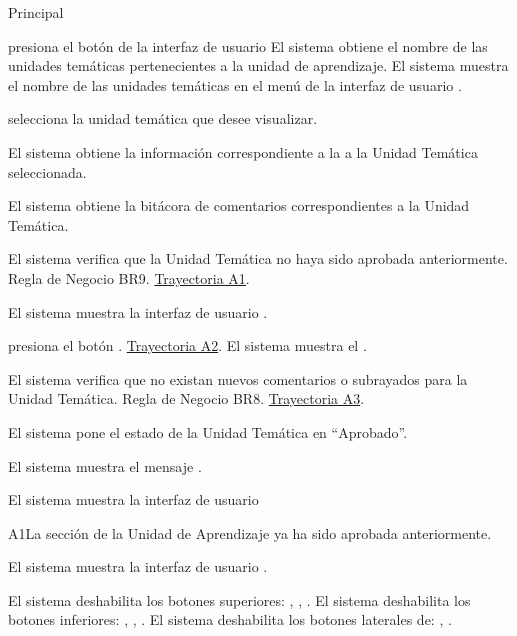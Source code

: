 \begin{UCtrayectoria}{Principal}

    \UCpaso[\UCactor] presiona el botón   de la interfaz de usuario 
	\UCpaso El sistema obtiene el nombre de las unidades temáticas pertenecientes a la unidad de aprendizaje.
	\UCpaso El sistema muestra el nombre de las unidades temáticas en el menú de la interfaz  de usuario .

    \UCpaso[\UCactor] selecciona la unidad temática que desee visualizar.
     
         \UCpaso El sistema obtiene la información correspondiente a la a la Unidad Temática seleccionada.
         
    \UCpaso El sistema obtiene la bitácora de comentarios correspondientes a la Unidad Temática. 
    
    \UCpaso El sistema verifica que la Unidad Temática   no haya sido aprobada anteriormente. Regla de Negocio BR9. \hyperlink{SP2-CU12-A1}{Trayectoria A1}. 
    
    \UCpaso El sistema muestra la interfaz de usuario  . 
    
    \UCpaso[\UCactor] presiona el botón . \hyperlink{SP2-CU12-A2}{Trayectoria A2}.
    \UCpaso El sistema muestra el .
    
    \UCpaso	El sistema verifica que no existan nuevos comentarios o subrayados para la Unidad Temática. Regla de Negocio BR8. \hyperlink{SP2-CU12-A3}{Trayectoria A3}. 
    
    \UCpaso El sistema pone el estado de la Unidad Temática en “Aprobado”.
    
    \UCpaso El sistema muestra el mensaje .

    \UCpaso El sistema muestra la interfaz de usuario 

\end{UCtrayectoria}


\begin{UCtrayectoriaA}{A1}{La sección de la Unidad de Aprendizaje ya ha sido aprobada anteriormente.}

	\hypertarget{SP2-CU12-A1}{\UCpaso El sistema muestra la interfaz de usuario .}
    \UCpaso El sistema deshabilita los botones superiores: , , .
    \UCpaso El sistema deshabilita los botones inferiores: , , .
    \UCpaso El sistema deshabilita los botones laterales de: , .
\end{UCtrayectoriaA}

